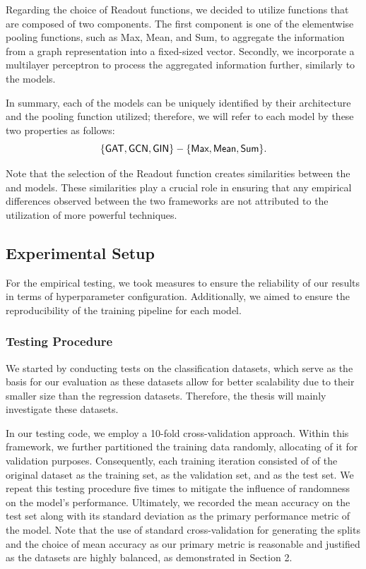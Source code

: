 Regarding the choice of \textsf{Readout} functions, we decided to utilize functions that are composed of two components. The first component is one of the elementwise pooling functions, such as \textsf{Max}, \textsf{Mean}, and \textsf{Sum}, to aggregate the information from a graph representation into a fixed-sized vector. Secondly, we incorporate a multilayer perceptron to process the aggregated information further, similarly to the \wlnn models.

In summary, each of the \gnn models can be uniquely identified by their \gnn architecture and the pooling function utilized; therefore, we will refer to each model by these two properties as follows:
\begin{equation*}
	{\{\gat, \gcn, \gin\}} - \{\textsf{Max}, \textsf{Mean}, \textsf{Sum}\}.
\end{equation*}

Note that the selection of the Readout function creates similarities between the \gnn and \wlnn models. These similarities play a crucial role in ensuring that any empirical differences observed between the two frameworks are not attributed to the utilization of more powerful techniques.

\subsection{Experimental Setup}

For the empirical testing, we took measures to ensure the reliability of our results in terms of hyperparameter configuration. Additionally, we aimed to ensure the reproducibility of the training pipeline for each model.

\subsubsection{Testing Procedure}
We started by conducting tests on the classification datasets, which serve as the basis for our evaluation as these datasets allow for better scalability due to their smaller size than the regression datasets. Therefore, the thesis will mainly investigate these datasets. 

In our testing code, we employ a 10-fold cross-validation approach. Within this framework, we further partitioned the training data randomly, allocating  of it for validation purposes. Consequently, each training iteration consisted of  of the original dataset as the training set,  as the validation set, and  as the test set. We repeat this testing procedure five times to mitigate the influence of randomness on the model's performance. Ultimately, we recorded the mean accuracy on the test set along with its standard deviation as the primary performance metric of the model. Note that the use of standard cross-validation for generating the splits and the choice of mean accuracy as our primary metric is reasonable and justified as the datasets are highly balanced, as demonstrated in Section 2.

